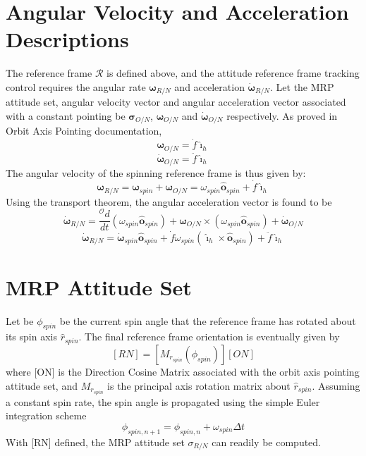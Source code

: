 \documentclass[]{AVSSimReportMemo}
\begin{document}
\section{Angular Velocity and Acceleration Descriptions}
The reference frame $\mathcal{R}$ is defined above, and the attitude reference frame tracking control requires the angular rate $\bm\omega_{R/N}$ and acceleration $\dot{\bm\omega}_{R/N}$. 
Let the MRP attitude set, angular velocity vector and angular acceleration vector associated with a constant pointing be $\bm\sigma_{O/N}$, $\bm\omega_{O/N}$ and $\bm\dot{\omega}_{O/N}$ respectively.
As proved in Orbit Axis Pointing documentation,
\begin{equation}
	\label{eq:dbeta}
	\bm\omega_{O/N} = \dot f \hat{\bm\imath}_{h} 
\end{equation}
\begin{equation}
	\label{eq:dbeta}
	\bm{\dot\omega}_{O/N} = \ddot{f} \hat{\bm\imath}_{h}
\end{equation}
The angular velocity of the spinning reference frame is thus given by:
\begin{equation}
	\label{eq:dbeta}
	\bm\omega_{R/N} = \bm\omega_{spin} + \bm\omega_{O/N} = \omega_{spin}\bm\hat{o}_{spin} + \dot f \hat{\bm\imath}_{h} 
\end{equation}
Using the transport theorem, the angular acceleration vector is found to be
\begin{equation}
	\label{eq:dbeta}
	\bm{\dot\omega}_{R/N} = \frac{^\mathcal{O} d}{dt} (\omega_{spin}\bm\hat{o}_{spin}) + \bm\omega_{O/N}\times (\omega_{spin}\bm\hat{o}_{spin}) + \bm{\dot\omega}_{O/N}
\end{equation}
\begin{equation}
	\label{eq:dbeta}
	\bm{\dot\omega}_{R/N} = \bm\dot\omega_{spin}\bm\hat{o}_{spin} +  \dot{f}\omega_{spin}(\bm\hat{\imath}_{h} \times \bm\hat{o}_{spin})+ \ddot f \hat{\bm\imath}_{h} 
\end{equation}

\section{MRP Attitude Set}
Let be $\phi_{spin}$ be the current spin angle that the reference frame has rotated about its spin axis $\hat r_{spin}$. The final reference frame orientation is eventually given by
\begin{equation}
	\label{eq:dbeta}
	[RN] =  [M_{r_{spin}} (\phi_{spin})][ON]
\end{equation}
where [ON] is the Direction Cosine Matrix associated with the orbit axis pointing attitude set, and $M_{r_{spin}}$ is the principal axis rotation matrix about $\hat r_{spin}$. Assuming a constant spin rate, the spin angle is propagated using the simple Euler integration scheme
\begin{equation}
	\label{eq:dbeta}
	\phi_{spin, n+1} = \phi_{spin, n} + \omega_{spin}\Delta t
\end{equation}
With [RN] defined, the MRP attitude set $\sigma_{R/N}$ can readily be computed.
\end{document}
